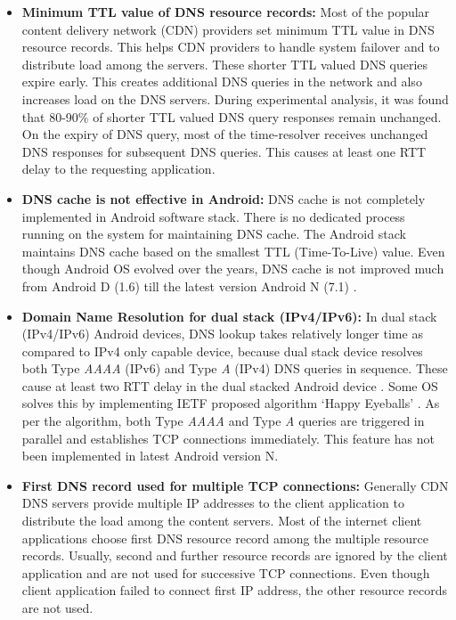 \begin{multicols}{2}
\begin{itemize}
\item  {\bf Minimum TTL value of DNS resource records:} Most of the popular content delivery network (CDN) providers set minimum TTL value in DNS resource records. This helps CDN providers to handle system failover and to distribute load among the servers. These shorter TTL valued DNS queries expire early. This creates additional DNS queries in the network and also increases load on the DNS servers. During experimental analysis, it was found that 80-90$\%$ of shorter TTL valued DNS query responses remain unchanged. On the expiry of DNS query, most of the time-resolver receives unchanged DNS responses for subsequent DNS queries. This causes at least one RTT delay to the requesting application.
\item{\bf DNS cache is not effective in Android:} DNS cache is not completely implemented in Android software stack. There is no dedicated process running on the system for maintaining DNS cache. The Android stack maintains DNS cache based on the smallest TTL (Time-To-Live) value. Even though Android OS evolved over the years, DNS cache is not improved much from Android D (1.6) till the latest version Android N (7.1) \cite{art1-key14}. 
\item {\bf Domain Name Resolution for dual stack (IPv4/IPv6):} In dual stack (IPv4/IPv6) Android devices, DNS lookup takes relatively longer time as compared to IPv4 only capable device, because dual stack device resolves both Type \textit{AAAA} (IPv6) and Type \textit{A} (IPv4) DNS queries in sequence. These cause at least two RTT delay in the dual stacked Android device \cite{art1-key15}. Some OS solves this by implementing IETF proposed algorithm `Happy Eyeballs’ \cite{art1-key16}. As per the algorithm, both Type \textit{AAAA} and Type \textit{A} queries are triggered in parallel and establishes TCP connections immediately. This feature has not been implemented in latest Android version N.
\item{\bf First DNS record used for multiple TCP connections:} Generally CDN DNS servers provide multiple IP addresses to the client application to distribute the load among the content servers. Most of the internet client applications choose first DNS resource record among the multiple resource records. Usually, second and further resource records are ignored by the client application and are not used for successive TCP connections. Even though client application failed to connect first IP address, the other resource records are not used.

\end{itemize}
\end{multicols}
